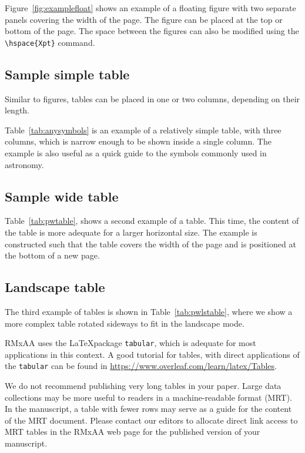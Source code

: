 \documentclass[9pt,article,twoside]{rmaa-rho-class/rmaa-rho}
\begin{document}
        Figure~\ref{fig:examplefloat} shows an example of a floating figure with two separate panels covering the width of the page. The figure can be placed at the top or bottom of the page. The space between the figures can also be modified using the \verb|\hspace{Xpt}| command.


    \subsection{Sample simple table}

        Similar to figures, tables can be placed in one or two columns, depending on their length.

        Table~\ref{tab:anysymbols} is an example of a relatively simple table, with three columns, which is narrow enough to be shown inside a single column. The example is also useful as a quick guide to the symbols commonly used in astronomy.

\subsection{Sample wide table}

        Table~\ref{tab:pwtable}, shows a second example of a table. This time, the content of the table is more adequate for a larger horizontal size. The example is constructed such that the table covers the width of the page and is positioned at the bottom of a new page.

\subsection{Landscape table}
    
 The third example of tables is shown in Table~\ref{tab:pwlstable}, where we show a more complex table rotated sideways to fit in the landscape mode. 

 RMxAA uses the \LaTeX package \texttt{tabular}, which is adequate for most applications in this context. A good tutorial for tables, with direct applications of the \texttt{tabular} can be found in \url{https://www.overleaf.com/learn/latex/Tables}. 

 We do not recommend publishing very long tables in your paper. Large data collections may be more useful to readers in a machine-readable format (MRT). In the manuscript, a table with fewer rows may serve as a guide for the content of the MRT document. Please contact our editors to allocate direct link access to MRT tables in the RMxAA web page for the published version of your manuscript. 
\end{document}
